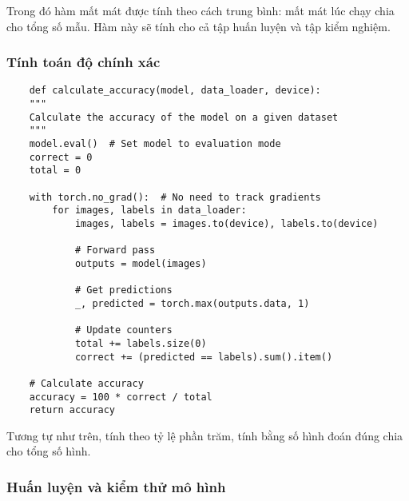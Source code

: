 \documentclass[../main.tex]{subfiles}
\begin{document}
Trong đó hàm mất mát được tính theo cách trung bình: mất mát lúc chạy chia cho tổng số mẫu. Hàm này sẽ tính cho cả tập huấn luyện và tập kiểm nghiệm.

\subsubsection*{Tính toán độ chính xác}

\begin{verbatim}
    def calculate_accuracy(model, data_loader, device):
    """
    Calculate the accuracy of the model on a given dataset
    """
    model.eval()  # Set model to evaluation mode
    correct = 0
    total = 0
    
    with torch.no_grad():  # No need to track gradients
        for images, labels in data_loader:
            images, labels = images.to(device), labels.to(device)
            
            # Forward pass
            outputs = model(images)
            
            # Get predictions
            _, predicted = torch.max(outputs.data, 1)
            
            # Update counters
            total += labels.size(0)
            correct += (predicted == labels).sum().item()
    
    # Calculate accuracy
    accuracy = 100 * correct / total
    return accuracy
\end{verbatim}

Tương tự như trên, tính theo tỷ lệ phần trăm, tính bằng số hình đoán đúng chia cho tổng số hình.

\subsubsection*{Huấn luyện và kiểm thử mô hình}
\end{document}
